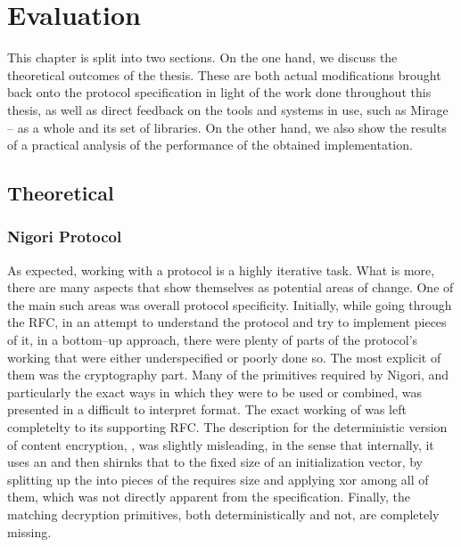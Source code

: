 \chapter{Evaluation} \label{chapter:evaluation}
This chapter is split into two sections.
On the one hand, we discuss the theoretical outcomes of the thesis.
These are both actual modifications brought back onto the protocol specification in light of the work done throughout this thesis, as well as direct feedback on the tools and systems in use, such as Mirage -- as a whole and its set of libraries.
On the other hand, we also show the results of a practical analysis of the performance of the obtained implementation.

\section{Theoretical}
\subsection{Nigori Protocol}
As expected, working with a \wip protocol is a highly iterative task.
What is more, there are many aspects that show themselves as potential areas of change.
One of the main such areas was overall protocol specificity.
Initially, while going through the RFC, in an attempt to understand the protocol and try to implement pieces of it, in a bottom--up approach, there were plenty of parts of the protocol's working that were either underspecified or poorly done so.
The most explicit of them was the cryptography part.
Many of the primitives required by Nigori, and particularly the exact ways in which they were to be used or combined, was presented in a difficult to interpret format.
The exact working of  was left completelty to its supporting RFC.
The description for the deterministic version of content encryption, , was slightly misleading, in the sense that internally, it uses an  and then shirnks that to the fixed size of an  initialization vector, by splitting up the  into pieces of the requires size and applying xor among all of them, which was not directly apparent from the specification.
Finally, the matching decryption primitives, both deterministically and not, are completely missing.

